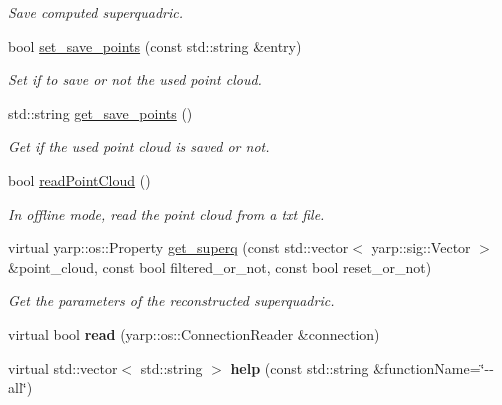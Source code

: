\begin{DoxyCompactItemize}
\begin{DoxyCompactList}\small\item\em Save computed superquadric. \end{DoxyCompactList}\item 
bool \hyperlink{classSuperqModule_a90826fc53859ecf126f22a2569611b2c}{set\-\_\-save\-\_\-points} (const std\-::string \&entry)
\begin{DoxyCompactList}\small\item\em Set if to save or not the used point cloud. \end{DoxyCompactList}\item 
std\-::string \hyperlink{classSuperqModule_adfeeea091edd0d32d388b072f4fc9d93}{get\-\_\-save\-\_\-points} ()
\begin{DoxyCompactList}\small\item\em Get if the used point cloud is saved or not. \end{DoxyCompactList}\item 
bool \hyperlink{classSuperqModule_a0e6af855b1a0f647ff4b9deca973c55d}{read\-Point\-Cloud} ()\label{classSuperqModule_a0e6af855b1a0f647ff4b9deca973c55d}

\begin{DoxyCompactList}\small\item\em In offline mode, read the point cloud from a txt file. \end{DoxyCompactList}\item 
virtual yarp\-::os\-::\-Property \hyperlink{classsuperquadricModel__IDL_a10039bb93445066d9dd29d8f6c9ef6c5}{get\-\_\-superq} (const std\-::vector$<$ yarp\-::sig\-::\-Vector $>$ \&point\-\_\-cloud, const bool filtered\-\_\-or\-\_\-not, const bool reset\-\_\-or\-\_\-not)
\begin{DoxyCompactList}\small\item\em Get the parameters of the reconstructed superquadric. \end{DoxyCompactList}\item 
virtual bool {\bfseries read} (yarp\-::os\-::\-Connection\-Reader \&connection)\label{classsuperquadricModel__IDL_ac72a24dddca13978d7adcd5cf4f40b1f}

\item 
virtual std\-::vector$<$ std\-::string $>$ {\bfseries help} (const std\-::string \&function\-Name=\char`\"{}-\/-\/all\char`\"{})\label{classsuperquadricModel__IDL_a263ca3dc1c7a21cc3ac40caadc95cf3d}

\end{DoxyCompactItemize}
